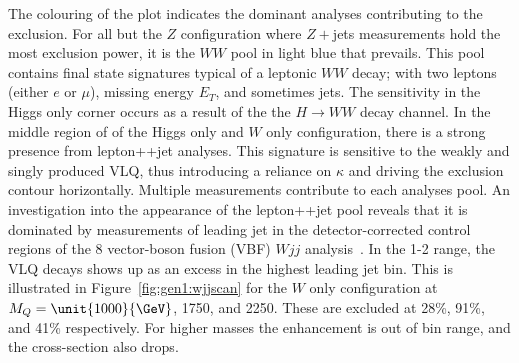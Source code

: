 The colouring of the plot indicates the dominant analyses contributing to the exclusion. For all but the $Z$ configuration where $Z+$jets measurements hold the most exclusion power, it is the \ATLAS $WW$ pool in light blue that prevails. This pool contains final state signatures typical of a leptonic $WW$ decay; with two leptons (either $e$ or $\mu$), missing energy $E_T$, and sometimes jets. The sensitivity in the Higgs only corner occurs as a result of the the $H\rightarrow WW$ decay channel. In the middle region of of the Higgs only and $W$ only configuration, there is a strong presence from \ATLAS lepton+\MET{}+jet analyses. This signature is sensitive to the weakly and singly produced VLQ, thus introducing a reliance on $\kappa$ and driving the exclusion contour horizontally. Multiple measurements contribute to each analyses pool. An investigation into the appearance of the lepton+\MET{}+jet pool reveals that it is dominated by measurements of leading jet \pT in the detector-corrected control regions of the \unit{8}{\TeV} \ATLAS vector-boson fusion (VBF) $Wjj$ analysis~\cite{Aaboud:2017fye}. In the \unit{1}{\TeV}-\unit{2}{\TeV} range, the VLQ decays shows up as an excess in the highest leading jet \pT bin. This is illustrated in Figure~\ref{fig:gen1:wjjscan} for the $W$ only configuration at $M_Q=\unit{1000}{\GeV}$, \unit{1750}{\GeV}, and \unit{2250}{\GeV}. These are excluded at 28\%, 91\%, and 41\% respectively. For higher masses the enhancement is out of bin range, and the cross-section also drops. 


